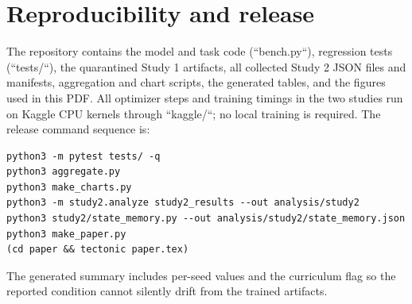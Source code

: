 \documentclass{article}
\begin{document}
\section{Reproducibility and release}
The repository contains the model and task code (``bench.py``), regression
tests (``tests/``), the quarantined Study 1 artifacts, all collected Study 2
JSON files and manifests, aggregation and chart scripts, the generated tables,
and the figures used in this PDF. All optimizer steps and training timings in
the two studies run on Kaggle CPU kernels through ``kaggle/``; no local
training is required.
The release command sequence is:
\begin{verbatim}
python3 -m pytest tests/ -q
python3 aggregate.py
python3 make_charts.py
python3 -m study2.analyze study2_results --out analysis/study2
python3 study2/state_memory.py --out analysis/study2/state_memory.json
python3 make_paper.py
(cd paper && tectonic paper.tex)
\end{verbatim}
The generated summary includes per-seed values and the curriculum flag so the
reported condition cannot silently drift from the trained artifacts.
\end{document}
